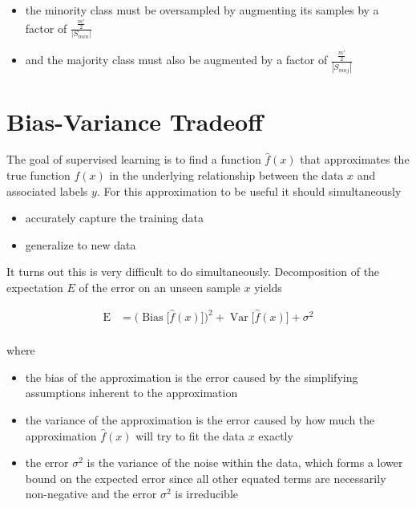 \begin{itemize}
    \item the minority class must be oversampled by augmenting its samples  by a factor of $\frac{\frac{m'}{2}}{|S_{min}|}$
    \item and the majority class must also be augmented by a factor of $\frac{\frac{m'}{2}}{|S_{maj}|}$
\end{itemize}

\section{Bias-Variance Tradeoff}

The goal of supervised learning is to find a function $\hat{f}(x)$ that approximates the true function $f(x)$ in the underlying relationship between the data $x$ and associated labels $y$. For this approximation to be useful it should simultaneously

\begin{itemize}
    \item accurately capture the training data
    \item generalize to new data
\end{itemize}

It turns out this is very difficult to do simultaneously. Decomposition of the expectation $E$ of the error on an unseen sample $x$ yields

$$
{\displaystyle {\begin{aligned}\operatorname {E} &={\Big (}\operatorname {Bias} {\big [}{\hat {f}}(x){\big ]}{\Big )}^{2}+\operatorname {Var} {\big [}{\hat {f}}(x){\big ]}+\sigma ^{2}\\\end{aligned}}}
$$

where

\begin{itemize}
    \item the bias of the approximation is the error caused by the simplifying assumptions inherent to the approximation
    \item the variance of the approximation is the error caused by how much the approximation $\hat{f}(x)$ will try to fit the data $x$ exactly
    \item the error $\sigma^2$ is the variance of the noise within the data, which forms a lower bound on the expected error since all other equated terms are necessarily non-negative and the error $\sigma^2$ is irreducible
\end{itemize}

